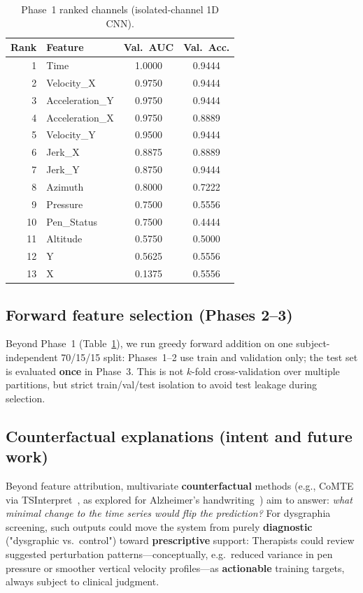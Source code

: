 \documentclass{article}
\begin{document}
\begin{table}[ht]
  \caption{Phase~1 ranked channels (isolated-channel 1D CNN).}
  \label{tab:phase1}
  \centering
  \footnotesize
  \begin{tabular}{r l cc}
    \toprule
    Rank & Feature & Val.\ AUC & Val.\ Acc. \\
    \midrule
    1  & Time            & 1.0000 & 0.9444 \\
    2  & Velocity\_X     & 0.9750 & 0.9444 \\
    3  & Acceleration\_Y & 0.9750 & 0.9444 \\
    4  & Acceleration\_X & 0.9750 & 0.8889 \\
    5  & Velocity\_Y     & 0.9500 & 0.9444 \\
    6  & Jerk\_X         & 0.8875 & 0.8889 \\
    7  & Jerk\_Y         & 0.8750 & 0.9444 \\
    8  & Azimuth         & 0.8000 & 0.7222 \\
    9  & Pressure        & 0.7500 & 0.5556 \\
    10 & Pen\_Status     & 0.7500 & 0.4444 \\
    11 & Altitude        & 0.5750 & 0.5000 \\
    12 & Y               & 0.5625 & 0.5556 \\
    13 & X               & 0.1375 & 0.5556 \\
    \bottomrule
  \end{tabular}
\end{table}

\subsection{Forward feature selection (Phases 2--3)}

Beyond Phase~1 (Table~\ref{tab:phase1}), we run greedy forward addition on one subject-independent 70/15/15 split: Phases~1--2 use train and validation only; the test set is evaluated \textbf{once} in Phase~3. This is not $k$-fold cross-validation over multiple partitions, but strict train/val/test isolation to avoid test leakage during selection. 


\subsection{Counterfactual explanations (intent and future work)}

Beyond feature attribution, multivariate \textbf{counterfactual} methods (e.g., CoMTE via TSInterpret~\cite{tsinterpret}, as explored for Alzheimer's handwriting~\cite{js2019ad}) aim to answer: \emph{what minimal change to the time series would flip the prediction?} For dysgraphia screening, such outputs could move the system from purely \textbf{diagnostic} ("dysgraphic vs.\ control") toward \textbf{prescriptive} support: Therapists could review suggested perturbation patterns---conceptually, e.g.\ reduced variance in pen pressure or smoother vertical velocity profiles---as \textbf{actionable} training targets, always subject to clinical judgment. 
\end{document}
